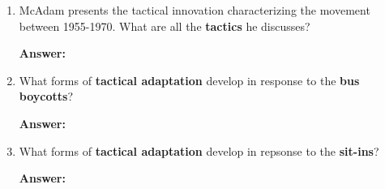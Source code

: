 \documentclass{article}
\newcommand{\answer}{\textbf{Answer:}$\;$}
\begin{document}
\begin{enumerate}[label=\arabic*)]
    \answer

    \item McAdam presents the tactical innovation characterizing the movement between 1955-1970. 
    What are all the \textbf{tactics} he discusses?
    
    \answer

    \item What forms of \textbf{tactical adaptation} develop in response to the \textbf{bus boycotts}?

    \answer


    \item What forms of \textbf{tactical adaptation} develop in repsonse to the \textbf{sit-ins}?

    \answer


    
\end{enumerate}
 
\end{document}
